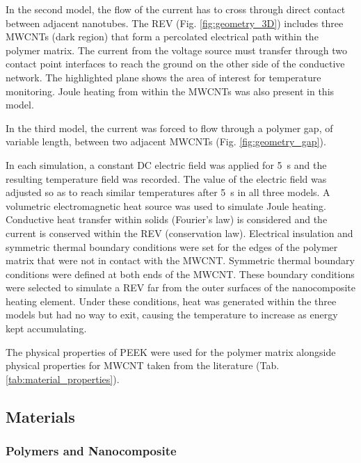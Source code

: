\documentclass[11pt,review,times]{elsarticle}
\begin{document}
In the second model, the flow of the current has to cross through direct contact between adjacent nanotubes. 
The REV (Fig. \ref{fig:geometry_3D}) includes three MWCNTs (dark region) that form a percolated electrical path within the polymer matrix. 
The current from the voltage source must transfer through two contact point interfaces to reach the ground on the other side of the conductive network. 
The highlighted plane shows the area of interest for temperature monitoring. 
Joule heating from within the MWCNTs was also present in this model. 

In the third model, the current was forced to flow through a polymer gap, of variable length, between two adjacent MWCNTs (Fig. \ref{fig:geometry_gap}). 

In each simulation, a constant DC electric field was applied for \SI{5}{\second} and the resulting temperature field was recorded. 
The value of the electric field was adjusted so as to reach similar temperatures after \SI{5}{\second} in all three models. 
A volumetric electromagnetic heat source was used to simulate Joule heating. 
Conductive heat transfer within solids (Fourier's law) is considered and the current is conserved within the REV (conservation law). 
Electrical insulation and symmetric thermal boundary conditions were set for the edges of the polymer matrix that were not in contact with the MWCNT. 
Symmetric thermal boundary conditions were defined at both ends of the MWCNT. 
These boundary conditions were selected to simulate a REV far from the outer surfaces of the nanocomposite heating element. 
Under these conditions, heat was generated within the three models but had no way to exit, causing the temperature to increase as energy kept accumulating.

The physical properties of PEEK were used for the polymer matrix alongside physical properties for MWCNT taken from the literature (Tab. \ref{tab:material_properties}). 

\subsection{Materials}

\subsubsection{Polymers and Nanocomposite}
\end{document}
